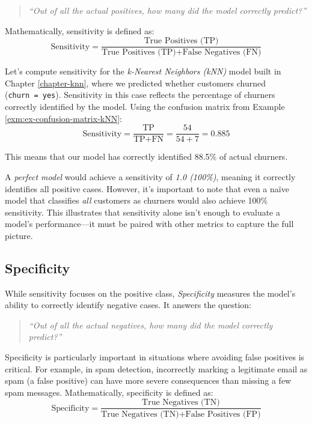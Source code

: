 \documentclass[
  11pt,
]{book}
\renewenvironment{quote}{\begin{quotation}}{\end{quotation}}
\theoremstyle{definition}
\theoremstyle{definition}
\theoremstyle{definition}
\theoremstyle{definition}
\theoremstyle{remark}
\begin{document}
\begin{quote}
\emph{``Out of all the actual positives, how many did the model correctly predict?''}
\end{quote}

Mathematically, sensitivity is defined as:\\
\[
\text{Sensitivity} = \frac{\text{True Positives (TP)}}{\text{True Positives (TP)} + \text{False Negatives (FN)}}
\]

Let's compute sensitivity for the \emph{k-Nearest Neighbors (kNN)} model built in Chapter \ref{chapter-knn}, where we predicted whether customers churned (\texttt{churn\ =\ yes}). Sensitivity in this case reflects the percentage of churners correctly identified by the model. Using the confusion matrix from Example \ref{exm:ex-confusion-matrix-kNN}:\\
\[
\text{Sensitivity} = \frac{\text{TP}}{\text{TP} + \text{FN}} = \frac{54}{54 + 7} = 0.885
\]

This means that our model has correctly identified 88.5\% of actual churners.

A \emph{perfect model} would achieve a sensitivity of \emph{1.0 (100\%)}, meaning it correctly identifies all positive cases. However, it's important to note that even a naïve model that classifies \emph{all} customers as churners would also achieve 100\% sensitivity. This illustrates that sensitivity alone isn't enough to evaluate a model's performance---it must be paired with other metrics to capture the full picture.

\subsection*{Specificity}\label{specificity}


While sensitivity focuses on the positive class, \emph{Specificity} measures the model's ability to correctly identify negative cases. It answers the question:

\begin{quote}
\emph{``Out of all the actual negatives, how many did the model correctly predict?''}
\end{quote}

Specificity is particularly important in situations where avoiding false positives is critical. For example, in spam detection, incorrectly marking a legitimate email as spam (a false positive) can have more severe consequences than missing a few spam messages. Mathematically, specificity is defined as:\\
\[
\text{Specificity} = \frac{\text{True Negatives (TN)}}{\text{True Negatives (TN)} + \text{False Positives (FP)}}
\]
\end{document}
